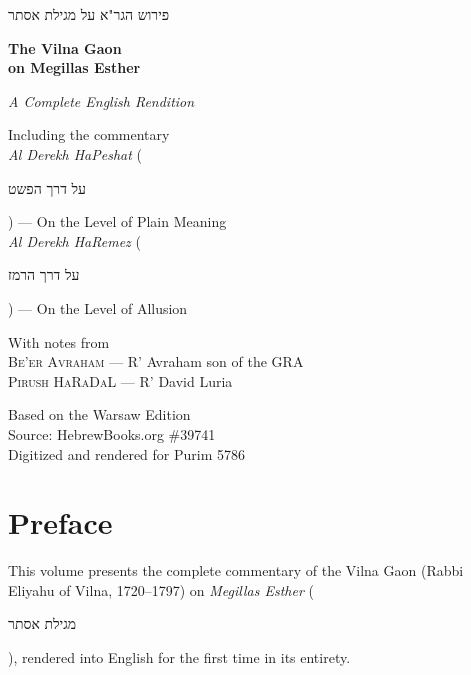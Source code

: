 \documentclass[11pt,twoside,openany]{book}
\newcommand{\heb}[1]{{\hebrewfont\begin{hebrew}#1\end{hebrew}}}
\newcommand{\hebterm}[2]{\textit{#1} (\heb{#2})}
\begin{document}
\begin{titlepage}
\begin{center}
\vspace*{1.5in}

{\hebrewfont\Huge\begin{hebrew}פירוש הגר"א על מגילת אסתר\end{hebrew}}

\vspace{0.3in}

{\Huge\bfseries The Vilna Gaon\\[4pt] on Megillas Esther}

\vspace{0.4in}

{\large\itshape A Complete English Rendition}

\vspace{0.15in}

{\normalsize Including the commentary\\
\hebterm{Al Derekh HaPeshat}{על דרך הפשט} — On the Level of Plain Meaning\\
\hebterm{Al Derekh HaRemez}{על דרך הרמז} — On the Level of Allusion}

\vspace{0.4in}

{\small With notes from\\[4pt]
\textsc{Be'er Avraham} — R' Avraham son of the GRA\\
\textsc{Pirush HaRaDaL} — R' David Luria}

\vspace{\fill}

{\footnotesize Based on the Warsaw Edition\\
Source: HebrewBooks.org \#39741\\[8pt]
Digitized and rendered for Purim 5786}

\end{center}
\end{titlepage}

\frontmatter

\chapter*{Preface}

This volume presents the complete commentary of the Vilna Gaon (Rabbi Eliyahu of Vilna, 1720--1797) on \hebterm{Megillas Esther}{מגילת אסתר}, rendered into English for the first time in its entirety.
\end{document}

